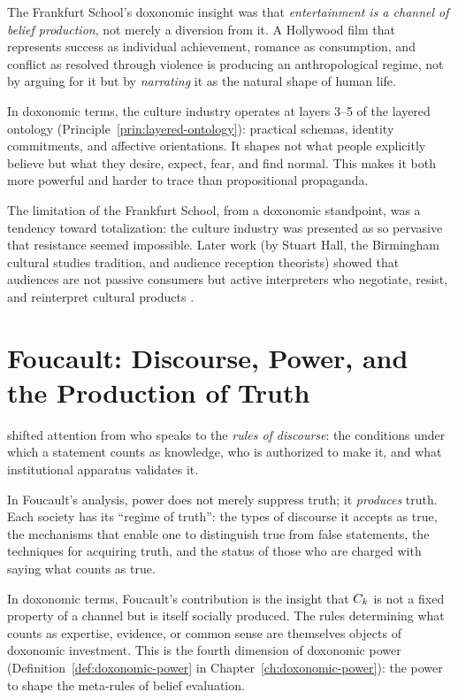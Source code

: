 The Frankfurt School's doxonomic insight was that \emph{entertainment is a channel of belief production}, not merely a diversion from it.
A Hollywood film that represents success as individual achievement, romance as consumption, and conflict as resolved through violence is producing an anthropological regime, not by arguing for it but by \emph{narrating} it as the natural shape of human life.

In doxonomic terms, the culture industry operates at layers 3--5 of the layered ontology (Principle~\ref{prin:layered-ontology}): practical schemas, identity commitments, and affective orientations.
It shapes not what people explicitly believe but what they desire, expect, fear, and find normal.
This makes it both more powerful and harder to trace than propositional propaganda.

The limitation of the Frankfurt School, from a doxonomic standpoint, was a tendency toward totalization: the culture industry was presented as so pervasive that resistance seemed impossible.
Later work (by Stuart Hall, the Birmingham cultural studies tradition, and audience reception theorists) showed that audiences are not passive consumers but active interpreters who negotiate, resist, and reinterpret cultural products \autocite{hall1980}.


\section{Foucault: Discourse, Power, and the Production of Truth}
\label{sec:ch3-foucault}

\textcite{foucault1971} shifted attention from who speaks to the \emph{rules of discourse}: the conditions under which a statement counts as knowledge, who is authorized to make it, and what institutional apparatus validates it.

In Foucault's analysis, power does not merely suppress truth; it \emph{produces} truth.
Each society has its ``regime of truth'': the types of discourse it accepts as true, the mechanisms that enable one to distinguish true from false statements, the techniques for acquiring truth, and the status of those who are charged with saying what counts as true.

In doxonomic terms, Foucault's contribution is the insight that $C_{k}$ is not a fixed property of a channel but is itself socially produced.
The rules determining what counts as expertise, evidence, or common sense are themselves objects of doxonomic investment.
This is the fourth dimension of doxonomic power (Definition~\ref{def:doxonomic-power} in Chapter~\ref{ch:doxonomic-power}): the power to shape the meta-rules of belief evaluation.


